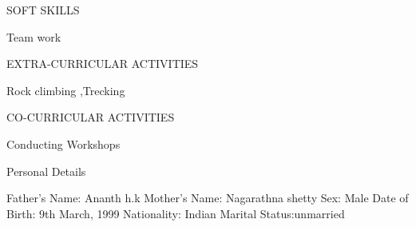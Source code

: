 \documentclass[10pt]{article}
\begin{document}
		
	\begin{minipage}[t][2cm][t]{0.2\textwidth}
		SOFT SKILLS
		
	\end{minipage}
	\begin{minipage}[t][2cm][t]{0.8\textwidth}
		Team work
		
	\end{minipage}



		
	\begin{minipage}[t][2cm][t]{0.2\textwidth}
		EXTRA-CURRICULAR ACTIVITIES
		
	\end{minipage}
	\begin{minipage}[t][2cm][t]{0.8\textwidth}
		Rock climbing ,Trecking
		
	\end{minipage}



		
	\begin{minipage}[t][2cm][t]{0.2\textwidth}
		CO-CURRICULAR ACTIVITIES
		
	\end{minipage}
	\begin{minipage}[t][2cm][t]{0.8\textwidth}
		Conducting Workshops
		
	\end{minipage}



		
	\begin{minipage}[t][2cm][t]{0.2\textwidth}
		Personal Details
		
	\end{minipage}
	\begin{minipage}[t][2cm][t]{0.8\textwidth}
		Father's Name: Ananth h.k
		\newline Mother's Name: Nagarathna shetty
		\newline Sex: Male
		\newline Date of Birth: 9th March, 1999
		\newline Nationality: Indian
		\newline Marital Status:unmarried
		
	\end{minipage}



		

	
	
\end{document}
